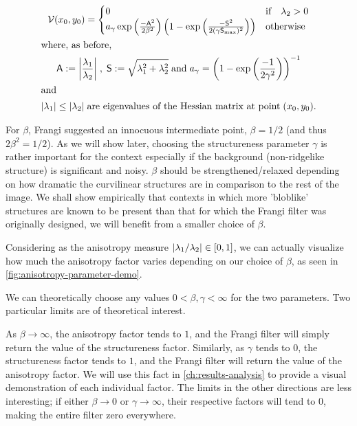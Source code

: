 \begin{gather} \label{eq:V_rescaled}
\V(x_0,y_0) = \begin{cases}
0 & \text{if} \quad \lambda_2 > 0 \\
a_\gamma \exp\left(\frac{-\Am^2}{2\beta^2}\right)
\left(1 - \exp\left(\frac{-\Sm^2}{2(\gamma \Smax)^2}\right)\right) & \text{otherwise}
\end{cases} \\
\shortintertext{where, as before,}
\Am := \abs*{\frac{\lambda_1}{\lambda_2}}
\;,\;
\Sm := \sqrt{\lambda_1^2 + \lambda_2^2}
\;\textrm{and}\;
a_\gamma = \left(1-\exp\left(\frac{-1}{2\gamma^2}\right)\right)^{-1} \notag\\
\shortintertext{and}
\abs*{\lambda_1} \le \abs*{\lambda_2}
\; \textrm{are eigenvalues of the Hessian matrix at point} \; (x_0, y_0).
\end{gather}

For $\beta$, Frangi suggested an innocuous intermediate point, $\beta=1/2$ (and thus $2\beta^2 = 1/2$).
As we will show later, choosing the structureness parameter $\gamma$ is rather important for the context especially if the background (non-ridgelike structure) is significant and noisy. $\beta$ should be strengthened/relaxed depending on how dramatic the curvilinear structures are in comparison to the rest of the image. We shall show empirically that contexts in which more 'bloblike' structures are known to be present than that for which the Frangi filter was originally designed, we will benefit from a smaller choice of $\beta$.

Considering as the anisotropy measure $\abs*{\lambda_1 / \lambda_2} \in [0,1]$,  we can actually visualize how much the 
anisotropy factor varies depending on our choice of $\beta$, as seen in \cref{fig:anisotropy-parameter-demo}.

We can theoretically choose any values $0 < \beta, \gamma < \infty$ for the two parameters. Two particular limits are of theoretical interest.

As $\beta \to \infty$, the anisotropy factor tends to $1$, and the Frangi filter will simply return the value of the structureness factor. Similarly, as $\gamma$ tends to $0$, the structureness factor tends to $1$, and the Frangi filter will return the value of the anisotropy factor. We will use this fact in \cref{ch:results-analysis} to provide a visual demonstration of each individual factor. The limits in the other directions are less interesting; if either $\beta \to 0$ or $\gamma \to \infty$, their respective factors will tend to $0$, making the entire filter zero everywhere.

